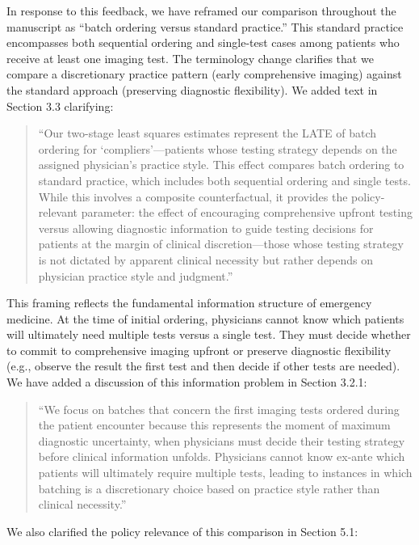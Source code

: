 \documentclass[11pt]{article}
\newcommand{\1}{\hbox{\rm 1\kern-.35em 1}}
\begin{document}
In response to this feedback, we have reframed our comparison throughout the manuscript as ``batch ordering versus standard practice.'' This standard practice encompasses both sequential ordering and single-test cases among patients who receive at least one imaging test. The terminology change clarifies that we compare a discretionary practice pattern (early comprehensive imaging) against the standard approach (preserving diagnostic flexibility). We added text in Section 3.3 clarifying:

\begin{quote}
``Our two-stage least squares estimates represent the LATE of batch ordering for `compliers'---patients whose testing strategy depends on the assigned physician's practice style. This effect compares batch ordering to standard practice, which includes both sequential ordering and single tests. While this involves a composite counterfactual, it provides the policy-relevant parameter: the effect of encouraging comprehensive upfront testing versus allowing diagnostic information to guide testing decisions for patients at the margin of clinical discretion---those whose testing strategy is not dictated by apparent clinical necessity but rather depends on physician practice style and judgment.''
\end{quote}

This framing reflects the fundamental information structure of emergency medicine. At the time of initial ordering, physicians cannot know which patients will ultimately need multiple tests versus a single test. They must decide whether to commit to comprehensive imaging upfront or preserve diagnostic flexibility (e.g., observe the result the first test and then decide if other tests are needed). We have added a discussion of this information problem in Section 3.2.1:

\begin{quote}
``We focus on batches that concern the first imaging tests ordered during the patient encounter because this represents the moment of maximum diagnostic uncertainty, when physicians must decide their testing strategy before clinical information unfolds. Physicians cannot know ex-ante which patients will ultimately require multiple tests, leading to instances in which batching is a discretionary choice based on practice style rather than clinical necessity.''
\end{quote}

We also clarified the policy relevance of this comparison in Section 5.1:
\end{document}
